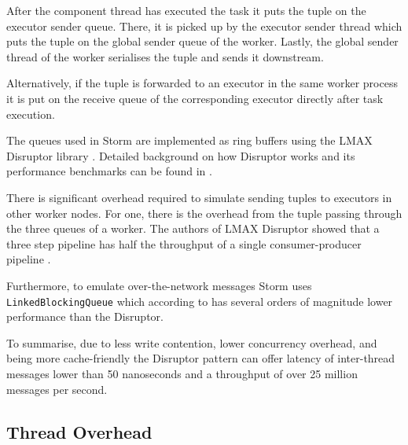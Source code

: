 After the component thread has executed the task it puts the tuple on the executor sender queue. There, it is picked up by the executor sender thread which puts the tuple on the global sender queue of the worker. Lastly, the global sender thread of the worker serialises the tuple and sends it downstream.

Alternatively, if the tuple is forwarded to an executor in the same worker process it is put on the receive queue of the corresponding executor directly after task execution.

The queues used in Storm are implemented as ring buffers using the LMAX Disruptor library \citep{LMAXDisruptor}. Detailed background on how Disruptor works and its performance benchmarks can be found in \cite{Thompson_Farley_Barker_Gee_Stewart_2011}.

There is significant overhead required to simulate sending tuples to executors in other worker nodes. For one, there is the overhead from the tuple passing through the three queues of a worker. The authors of LMAX Disruptor showed that a three step pipeline has half the throughput of a single consumer-producer pipeline \cite{DisruptorWiki}.

Furthermore, to emulate over-the-network messages Storm uses \texttt{LinkedBlockingQueue} which according to \cite{Thompson_Farley_Barker_Gee_Stewart_2011} has several orders of magnitude lower performance than the Disruptor.

To summarise, due to less write contention, lower concurrency overhead, and being more cache-friendly the Disruptor pattern can offer latency of inter-thread messages lower than 50 nanoseconds and a throughput of over 25 million messages per second.

\subsection{Thread Overhead}


